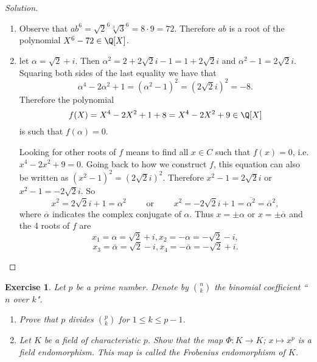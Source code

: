 \documentclass[a4paper,10pt,reqno]{amsart}
\newtheorem{ex}{Exercise}[section]
\newenvironment{sol}
  {\renewcommand\qedsymbol{$\blacksquare$}\begin{proof}[Solution]}
  {\end{proof}}
\begin{document}
\begin{sol}~
    \begin{enumerate}[label=(\roman*)]
        \item Observe that $ab^6=\sqrt{2}^6\sqrt[3]{3}^6=8\cdot 9=72$.
        Therefore $ab$ is a root of the polynomial $X^6-72\in\Q[X]$.
        \item let $\alpha=\sqrt{2} + i$. 
        Then $\alpha^2=2+2\sqrt{2}i-1=1+2\sqrt{2}i$ and $\alpha^2-1=2\sqrt{2}i$.
        Squaring both sides of the last equality we have that
        \[
         \alpha^4-2\alpha^2+1=(\alpha^2-1)^2=(2\sqrt{2}i)^2=-8.
        \]
        Therefore the polynomial 
        \[
        f(X)=X^4-2X^2+1+8=X^4-2X^2+9\in \Q[X]
        \]
        is such that $f(\alpha)=0$.

        Looking for other roots of $f$ means to find all $x\in C$
        such that $f(x)=0$, i.e. $x^4-2x^2+9=0$. 
        Going back to how we construct $f$, this equation 
        can also be written as $(x^2-1)^2=(2\sqrt{2}i)^2$.
        Therefore $x^2-1=2\sqrt{2}i$ or $x^2-1=-2\sqrt{2}i$.
        So 
        \[
        x^2=2\sqrt{2}i+1=\alpha^2\qquad\text{ or } \qquad x^2=-2\sqrt{2}i+1=\overline{\alpha^2}=\overline{\alpha}^2,
        \]
        where $\overline{\alpha}$ indicates the complex conjugate of 
        $\alpha$.
        Thus $x=\pm \alpha$ or $x=\pm \overline{\alpha}$ and the 4 roots of $f$ are
        \[
        x_1=\alpha=\sqrt{2} + i, x_2=-\alpha=-\sqrt{2} - i,
        \]
        \[
        x_3=\overline{\alpha}=\sqrt{2} - i, x_4=-\overline{\alpha}=-\sqrt{2} + i.
        \]
    \end{enumerate}
\end{sol}

\begin{ex} Let $p$ be a prime number. Denote by $\binom{n}{k}$ the binomial coefficient ``$n$ over $k$".
    \begin{enumerate}[label=(\roman*)]
    \item Prove that $p$ divides $\binom{p}{k}$ for $1 \leq k \leq p-1$.
    \item Let $K$ be a field of characteristic $p$. Show that the map $\Phi: K \to K$; $x \mapsto x^p$ is a field endomorphism. This map is called the \emph{Frobenius endomorphism} of $K$.
\end{enumerate}
\end{ex}
\end{document}
